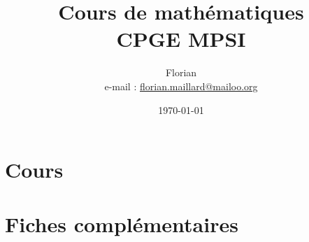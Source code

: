 \documentclass[10pt, a4paper, oneside]{book}
\title{\textbf{\Huge Cours de mathématiques \\ CPGE MPSI}}
\author{Florian \bsc{Maillard}\\ e-mail : \href{mailto:florian.maillard@mailoo.org}{florian.maillard@mailoo.org}}
\date{\today}
\begin{document}
\frontmatter
\maketitle
%
\mainmatter

\part{Cours}
































%
\appendix
\part{Fiches compl\'ementaires}










%
\backmatter
\dominitoc
\dominilof
\dominilot
\tableofcontents
\listoffigures
\listoftables
\end{document}
